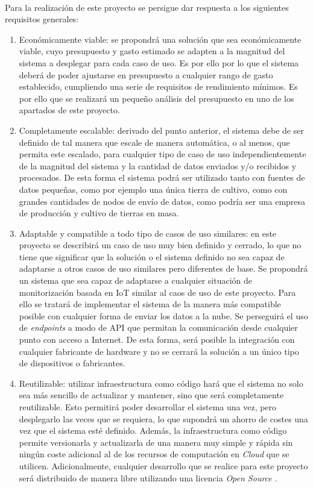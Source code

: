 \documentclass[../../memoria.tex]{subfiles}
\begin{document}
\paragraph{}
Para la realización de este proyecto se persigue dar respuesta a los siguientes requisitos generales:

\begin{enumerate}
    \item Económicamente viable: se propondrá una solución que sea económicamente viable, cuyo presupuesto y gasto estimado se adapten a la magnitud del sistema a desplegar para cada caso de uso. Es por ello por lo que el sistema deberá de poder ajustarse en presupuesto a cualquier rango de gasto establecido, cumpliendo una serie de requisitos de rendimiento mínimos. Es por ello que se realizará un pequeño análisis del presupuesto en uno de los apartados de este proyecto.

    \item Completamente escalable: derivado del punto anterior, el sistema debe de ser definido de tal manera que escale de manera automática, o al menos, que permita este escalado, para cualquier tipo de caso de uso independientemente de la magnitud del sistema y la cantidad de datos enviados y/o recibidos y procesados. De esta forma el sistema podrá ser utilizado tanto con fuentes de datos pequeñas, como por ejemplo una única tierra de cultivo, como con grandes cantidades de nodos de envío de datos, como podría ser una empresa de producción y cultivo de tierras en masa.

    \item Adaptable y compatible a todo tipo de casos de uso similares: en este proyecto se describirá un caso de uso muy bien definido y cerrado, lo que no tiene que significar que la solución o el sistema definido no sea capaz de adaptarse a otros casos de uso similares pero diferentes de base. Se propondrá un sistema que sea capaz de adaptarse a cualquier situación de monitorización basada en IoT similar al caos de uso de este proyecto. Para ello se tratará de implementar el sistema de la manera más compatible posible con cualquier forma de enviar los datos a la nube. Se perseguirá el uso de \textit{endpoints} a modo de API que permitan la comunicación desde cualquier punto con acceso a Internet. De esta forma, será posible la integración con cualquier fabricante de hardware y no se cerrará la solución a un único tipo de dispositivos o fabricantes.

    \item Reutilizable: utilizar infraestructura como código hará que el sistema no solo sea más sencillo de actualizar y mantener, sino que será completamente reutilizable. Esto permitirá poder desarrollar el sistema una vez, pero desplegarlo las veces que se requiera, lo que supondrá un ahorro de costes una vez que el sistema esté definido. Además, la infraestructura como código permite versionarla y actualizarla de una manera muy simple y rápida sin ningún coste adicional al de los recursos de computación en \textit{Cloud} que se utilicen. Adicionalmente, cualquier desarrollo que se realice para este proyecto será distribuido de manera libre utilizando una licencia \textit{Open Source} \cite{repogithub}.


\end{enumerate}
\end{document}
